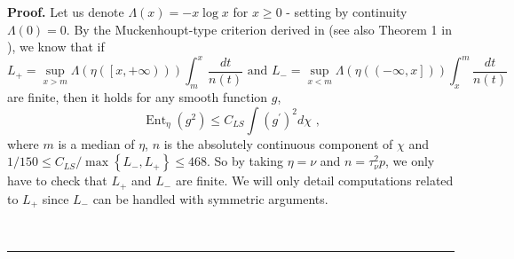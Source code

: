 \documentclass[11pt]{article}
\newenvironment{proof}[1][Proof]{\noindent\textbf{#1.} }{\ \rule{0.5em}{0.5em}}
\DeclareMathOperator{\ent}{Ent}
\begin{document}
\begin{proof}
Let us denote $\Lambda \left( x\right) =-x\log x$ for $x\geq 0$ - setting by
continuity $\Lambda (0)=0$. By the Muckenhoupt-type criterion derived in 
\cite{MR1682772} (see also Theorem 1 in \cite{MR2052235}), we know that if 
\begin{equation}
L_{+}=\sup_{x>m}\Lambda \left( \eta \left( \left[ x,+\infty \right) \right)
\right) \int_{m}^{x}\frac{dt}{n\left( t\right) }\text{ \ \ \ \ and \ \ \ \ }%
L_{-}=\sup_{x<m}\Lambda \left( \eta \left( \left( -\infty ,x\right] \right)
\right) \int_{x}^{m}\frac{dt}{n\left( t\right) }  \label{def_Muck_log_Sob}
\end{equation}%
are finite, then it holds for any smooth function $g$,%
\begin{equation*}
\ent%
_{\eta }\left( g^{2}\right) \leq C_{LS}\int \left( g^{\prime }\right)
^{2}d\chi \text{ ,}
\end{equation*}%
where $m$ is a median of $\eta $, $n$ is the absolutely continuous component
of $\chi $ and $1/150\leq C_{LS}/\max \left\{ L_{-},L_{+}\right\} \leq 468$.
So by taking $\eta =\nu $ and $n=\tau _{\nu }^{2}p$, we only have to check
that $L_{+}$ and $L_{-}$ are finite. We will only detail computations
related to $L_{+}$ since $L_{-}$ can be handled with symmetric arguments.


\end{proof}
\end{document}
